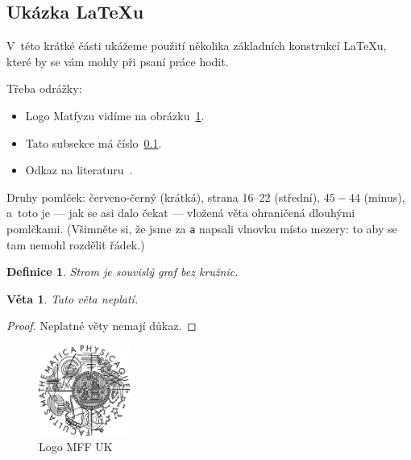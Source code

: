 
\subsection{Ukázka \LaTeX{}u}
\label{ssec:ukazka}

V~této krátké části ukážeme použití několika základních konstrukcí \LaTeX{}u,
které by se vám mohly při psaní práce hodit.

Třeba odrážky:

\begin{itemize}
\item Logo Matfyzu vidíme na obrázku~\ref{fig:mff}.
\item Tato subsekce má číslo~\ref{ssec:ukazka}.
\item Odkaz na literaturu~\cite{lamport94}.
\end{itemize}

Druhy pomlček:
červeno-černý (krátká),
strana 16--22 (střední),
$45-44$ (minus),
a~toto je --- jak se asi dalo čekat --- vložená věta ohraničená dlouhými pomlčkami.
(Všimněte si, že jsme za \verb|a| napsali vlnovku místo mezery: to aby se
tam nemohl rozdělit řádek.)


\newtheorem{theorem}{Věta}
\newtheorem*{define}{Definice}	%

\begin{define}
{\sl Strom} je souvislý graf bez kružnic.
\end{define}

\begin{theorem}
Tato věta neplatí.
\end{theorem}

\begin{proof}
Neplatné věty nemají důkaz.
\end{proof}

\begin{figure}
	\centering
	\includegraphics[width=30mm]{logo.eps}
	\caption{Logo MFF UK}
	\label{fig:mff}
\end{figure}
